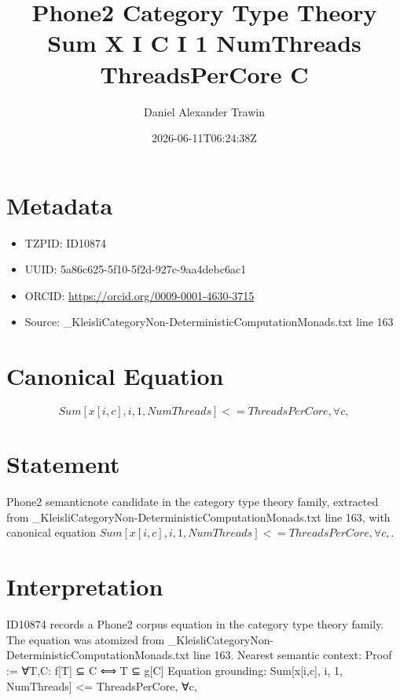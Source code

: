 \documentclass[11pt]{article}
\title{Phone2 Category Type Theory Sum X I C I 1 NumThreads ThreadsPerCore C}
\author{Daniel Alexander Trawin}
\date{2026-06-11T06:24:38Z}
\begin{document}
\maketitle
\section*{Metadata}
\begin{itemize}
\item TZPID: ID10874
\item UUID: 5a86c625-5f10-5f2d-927c-9aa4debc6ac1
\item ORCID: \url{https://orcid.org/0009-0001-4630-3715}
\item Source: _KleisliCategoryNon-DeterministicComputationMonads.txt line 163
\end{itemize}
\section*{Canonical Equation}
\[
Sum[x[i,c], {i, 1, NumThreads}] <= ThreadsPerCore, ∀c,
\]
\section*{Statement}
Phone2 semanticnote candidate in the category type theory family, extracted from _KleisliCategoryNon-DeterministicComputationMonads.txt line 163, with canonical equation $Sum[x[i,c], {i, 1, NumThreads}] <= ThreadsPerCore, ∀c,$.
\section*{Interpretation}
ID10874 records a Phone2 corpus equation in the category type theory family. The equation was atomized from _KleisliCategoryNon-DeterministicComputationMonads.txt line 163. Nearest semantic context: Proof := ∀T,C: f[T] ⊆ C ⟺ T ⊆ g[C] Equation grounding: Sum[x[i,c], {i, 1, NumThreads}] <= ThreadsPerCore, ∀c,
\end{document}
